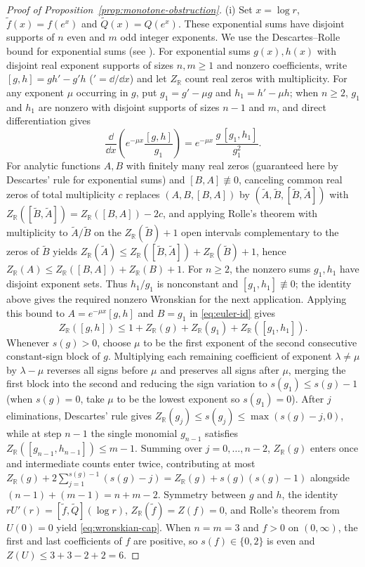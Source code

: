 \begin{proof}[Proof of Proposition~\ref{prop:monotone-obstruction}]
(i) Set $x=\log r$, $\tilde f(x)=f(e^x)$ and $\tilde Q(x)=Q(e^x)$.
These exponential sums have disjoint supports of $n$ even and $m$ odd
integer exponents. We use the Descartes--Rolle bound for exponential sums
(see \cite{Jameson}). For exponential sums $g(x),h(x)$
with disjoint real exponent supports of sizes $n,m\ge 1$ and nonzero coefficients, write
$[g,h]=gh'-g'h$ ($\prime=\dd/\dd x$) and let $Z_{\mathbb{R}}$ count real zeros with multiplicity. For
any exponent $\mu$ occurring in $g$, put $g_1=g'-\mu g$ and $h_1=h'-\mu h$; when $n\ge 2$, $g_1$ and
$h_1$ are nonzero with disjoint supports of sizes $n-1$ and $m$, and direct differentiation gives
\begin{equation}\label{eq:euler-id}
  \frac{\dd}{\dd x}\!\left(e^{-\mu x}\frac{[g,h]}{g_1}\right) = e^{-\mu x}\,\frac{g\,[g_1,h_1]}{g_1^2}.
\end{equation}
For analytic functions $A,B$ with finitely many real zeros (guaranteed here by Descartes' rule for
exponential sums) and $[B,A]\not\equiv 0$, canceling common real zeros of total multiplicity $c$
replaces $(A,B,[B,A])$ by $(\tilde{A},\tilde{B},[\tilde{B},\tilde{A}])$ with
$Z_{\mathbb{R}}([\tilde{B},\tilde{A}])=Z_{\mathbb{R}}([B,A])-2c$, and applying Rolle's theorem with
multiplicity to $\tilde{A}/\tilde{B}$ on the $Z_{\mathbb{R}}(\tilde{B})+1$ open intervals
complementary to the zeros of $\tilde{B}$ yields $Z_{\mathbb{R}}(\tilde{A})\le
Z_{\mathbb{R}}([\tilde{B},\tilde{A}])+Z_{\mathbb{R}}(\tilde{B})+1$, hence $Z_{\mathbb{R}}(A)\le
Z_{\mathbb{R}}([B,A])+Z_{\mathbb{R}}(B)+1$. For $n\ge2$, the nonzero sums $g_1,h_1$ have disjoint exponent sets.
Thus $h_1/g_1$ is nonconstant and $[g_1,h_1]\not\equiv0$; the identity
above gives the required nonzero Wronskian for the next application.
Applying this bound to $A=e^{-\mu x}[g,h]$ and $B=g_1$ in
\eqref{eq:euler-id} gives
\[
  Z_{\mathbb{R}}([g,h]) \le 1 + Z_{\mathbb{R}}(g) + Z_{\mathbb{R}}(g_1) + Z_{\mathbb{R}}([g_1,h_1]).
\]
Whenever $s(g)>0$, choose $\mu$ to be the first exponent of the second consecutive constant-sign block
of $g$. Multiplying each remaining coefficient of exponent $\lambda\ne\mu$ by $\lambda-\mu$ reverses
all signs before $\mu$ and preserves all signs after $\mu$, merging the first block into the second
and reducing the sign variation to $s(g_1)\le s(g)-1$ (when $s(g)=0$, take $\mu$ to be the lowest
exponent so $s(g_1)=0$). After $j$ eliminations, Descartes' rule gives $Z_{\mathbb{R}}(g_j)\le
s(g_j)\le \max(s(g)-j,0)$, while at step $n-1$ the single monomial $g_{n-1}$ satisfies
$Z_{\mathbb{R}}([g_{n-1},h_{n-1}])\le m-1$. Summing over $j=0,\dots,n-2$, $Z_{\mathbb{R}}(g)$ enters
once and intermediate counts enter twice, contributing at most
$Z_{\mathbb{R}}(g)+2\sum_{j=1}^{s(g)-1}(s(g)-j)=Z_{\mathbb{R}}(g)+s(g)(s(g)-1)$ alongside
$(n-1)+(m-1)=n+m-2$. Symmetry between $g$ and $h$, the identity $rU'(r)=[\tilde f,\tilde Q](\log r)$,
$Z_{\mathbb{R}}(\tilde f)=Z(f)=0$, and Rolle's theorem from $U(0)=0$ yield \eqref{eq:wronskian-cap}. When
$n=m=3$ and $f>0$ on $(0,\infty)$, the first and last coefficients of $f$ are positive, so
$s(f)\in\{0,2\}$ is even and $Z(U)\le 3+3-2+2=6$.


\end{proof}
